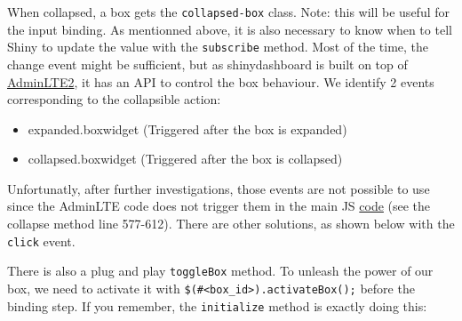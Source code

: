 \documentclass[
]{book}
\providecommand{\tightlist}{%
  \setlength{\itemsep}{0pt}\setlength{\parskip}{0pt}}
\begin{document}
When collapsed, a box gets the \texttt{collapsed-box} class. Note: this will be useful for the input binding. As mentionned above, it is also necessary to know when to tell Shiny to update the value with the \texttt{subscribe} method. Most of the time, the change event might be sufficient, but as shinydashboard is built on top of \href{https://adminlte.io/docs/2.4/js-box-widget}{AdminLTE2}, it has an API to control the box behaviour. We identify 2 events corresponding to the collapsible action:

\begin{itemize}
\tightlist
\item
  expanded.boxwidget (Triggered after the box is expanded)
\item
  collapsed.boxwidget (Triggered after the box is collapsed)
\end{itemize}

Unfortunatly, after further investigations, those events are not possible to use since the AdminLTE code does not trigger them in the main JS \href{https://github.com/rstudio/shinydashboard/blob/master/srcjs/AdminLTE/app.js}{code} (see the collapse method line 577-612). There are other solutions, as shown below with the \texttt{click} event.

There is also a plug and play \texttt{toggleBox} method. To unleash the power of our box, we need to activate it with \texttt{\$(\textquotesingle{}\#\textless{}box\_id\textgreater{}\textquotesingle{}).activateBox();} before the binding step. If you remember, the \texttt{initialize} method is exactly doing this:
\end{document}
